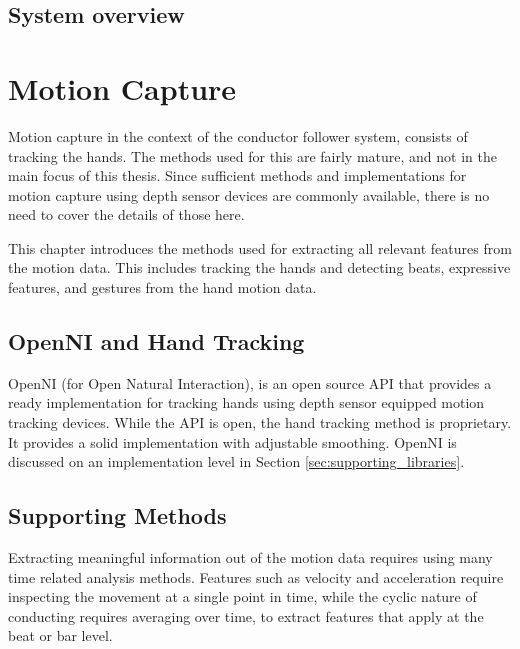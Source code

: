 
\section{System overview}

\chapter{Motion Capture}
\label{chapter:motion_capture}

Motion capture in the context of the conductor follower system,
consists of tracking the hands.
The methods used for this are fairly mature,
and not in the main focus of this thesis.
Since sufficient methods and implementations for
motion capture using depth sensor devices
are commonly available,
there is no need to cover the details of those here.


This chapter introduces the methods used for
extracting all relevant features from the motion data.
This includes tracking the hands and
detecting beats, expressive features,
and gestures from the hand motion data.

\section{OpenNI and Hand Tracking}

OpenNI (for Open Natural Interaction),
is an open source API that provides
a ready implementation for tracking hands
using depth sensor equipped motion tracking devices.
While the API is open, 
the hand tracking method is proprietary.
It provides a solid implementation
with adjustable smoothing.
OpenNI is discussed on an implementation level in Section
\ref{sec:supporting_libraries}.

\section{Supporting Methods}

Extracting meaningful information out of the motion data
requires using many time related analysis methods.
Features such as velocity and acceleration
require inspecting the movement at a single point in time,
while the cyclic nature of conducting requires
averaging over time, to extract features that apply
at the beat or bar level.

